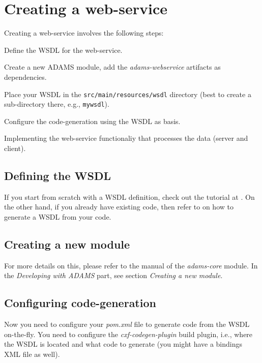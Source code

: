 \documentclass[a4paper]{book}
\begin{document}
\chapter{Creating a web-service}
Creating a web-service involves the following steps:
\begin{tight_enumerate}
	\item Define the WSDL for the web-service.
	\item Create a new ADAMS module, add the \textit{adams-webservice} artifacts
	as dependencies.
	\item Place your WSDL in the \texttt{src/main/resources/wsdl} directory
	(best to create a sub-directory there, e.g., \texttt{mywsdl}).
	\item Configure the code-generation using the WSDL as basis.
	\item Implementing the web-service functionaliy that processes the 
	data (server and client).
\end{tight_enumerate}

\section{Defining the WSDL}
If you start from scratch with a WSDL definition, check out the tutorial
at \cite{wsdl-tutorial}. On the other hand, if you already have existing
code, then refer to \cite{cxf-contract-first} on how to generate a WSDL from 
your code.

\section{Creating a new module}
For more details on this, please refer to the manual of the \textit{adams-core}
module. In the \textit{Developing with ADAMS} part, see section 
\textit{Creating a new module}.

\section{Configuring code-generation}
Now you need to configure your \textit{pom.xml} file to generate code from
the WSDL on-the-fly. You need to configure the \textit{cxf-codegen-plugin}
build plugin, i.e., where the WSDL is located and what code to generate
(you might have a bindings XML file as well).
\end{document}
